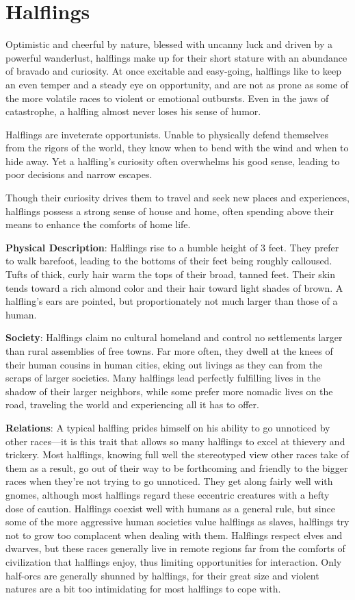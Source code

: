 \section{Halflings}

				
Optimistic and cheerful by nature, blessed with uncanny luck and driven by a powerful wanderlust, halflings make up for their short stature with an abundance of bravado and curiosity. At once excitable and easy-going, halflings like to keep an even temper and a steady eye on opportunity, and are not as prone as some of the more volatile races to violent or emotional outbursts. Even in the jaws of catastrophe, a halfling almost never loses his sense of humor.
				
Halflings are inveterate opportunists. Unable to physically defend themselves from the rigors of the world, they know when to bend with the wind and when to hide away. Yet a halfling's curiosity often overwhelms his good sense, leading to poor decisions and narrow escapes. 
				
Though their curiosity drives them to travel and seek new places and experiences, halflings possess a strong sense of house and home, often spending above their means to enhance the comforts of home life. 
				
\textbf{Physical Description}: Halflings rise to a humble height of 3 feet. They prefer to walk barefoot, leading to the bottoms of their feet being roughly calloused. Tufts of thick, curly hair warm the tops of their broad, tanned feet. Their skin tends toward a rich almond color and their hair toward light shades of brown. A halfling's ears are pointed, but proportionately not much larger than those of a human.
				
\textbf{Society}: Halflings claim no cultural homeland and control no settlements larger than rural assemblies of free towns. Far more often, they dwell at the knees of their human cousins in human cities, eking out livings as they can from the scraps of larger societies. Many halflings lead perfectly fulfilling lives in the shadow of their larger neighbors, while some prefer more nomadic lives on the road, traveling the world and experiencing all it has to offer.
				
\textbf{Relations}: A typical halfling prides himself on his ability to go unnoticed by other races---it is this trait that allows so many halflings to excel at thievery and trickery. Most halflings, knowing full well the stereotyped view other races take of them as a result, go out of their way to be forthcoming and friendly to the bigger races when they're not trying to go unnoticed. They get along fairly well with gnomes, although most halflings regard these eccentric creatures with a hefty dose of caution. Halflings coexist well with humans as a general rule, but since some of the more aggressive human societies value halflings as slaves, halflings try not to grow too complacent when dealing with them. Halflings respect elves and dwarves, but these races generally live in remote regions far from the comforts of civilization that halflings enjoy, thus limiting opportunities for interaction. Only half-orcs are generally shunned by halflings, for their great size and violent natures are a bit too intimidating for most halflings to cope with. 
				
